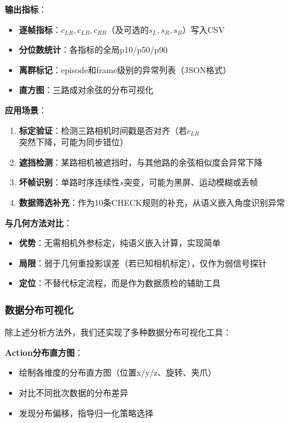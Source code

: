 \textbf{输出指标}：
\begin{itemize}[leftmargin=2em]
    \item \textbf{逐帧指标}：$c_{LR}, c_{LB}, c_{RB}$（及可选的$s_L, s_R, s_B$）写入CSV
    \item \textbf{分位数统计}：各指标的全局p10/p50/p90
    \item \textbf{离群标记}：episode和frame级别的异常列表（JSON格式）
    \item \textbf{直方图}：三路成对余弦的分布可视化
\end{itemize}

\textbf{应用场景}：
\begin{enumerate}[leftmargin=2em]
    \item \textbf{标定验证}：检测三路相机时间戳是否对齐（若$c_{LR}$突然下降，可能为同步错位）
    \item \textbf{遮挡检测}：某路相机被遮挡时，与其他路的余弦相似度会异常下降
    \item \textbf{坏帧识别}：单路时序连续性$s$突变，可能为黑屏、运动模糊或丢帧
    \item \textbf{数据筛选补充}：作为10条CHECK规则的补充，从语义嵌入角度识别异常
\end{enumerate}

\textbf{与几何方法对比}：
\begin{itemize}[leftmargin=2em]
    \item \textbf{优势}：无需相机外参标定，纯语义嵌入计算，实现简单
    \item \textbf{局限}：弱于几何重投影误差（若已知相机标定），仅作为弱信号探针
    \item \textbf{定位}：不替代标定流程，而是作为数据质检的辅助工具
\end{itemize}

\subsubsection{数据分布可视化}

除上述分析方法外，我们还实现了多种数据分布可视化工具：

\textbf{Action分布直方图}：
\begin{itemize}[leftmargin=2em]
    \item 绘制各维度的分布直方图（位置x/y/z、旋转、夹爪）
    \item 对比不同批次数据的分布差异
    \item 发现分布偏移，指导归一化策略选择
\end{itemize}

